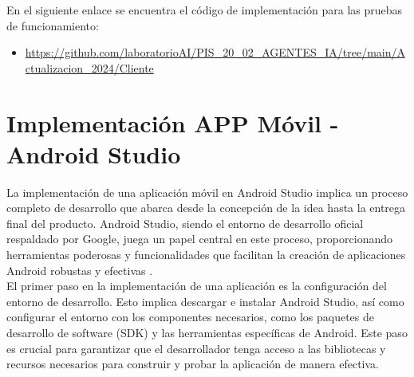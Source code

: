 \documentclass[a4paper,10pt, oneside, titlepage]{article}
\begin{document}
	\indent En el siguiente enlace se encuentra el código de implementación para las pruebas de funcionamiento:
	\begin{itemize}
		\item \textcolor{blue}{\url{https://github.com/laboratorioAI/PIS_20_02_AGENTES_IA/tree/main/Actualizacion_2024/Cliente}}
	\end{itemize}
	
	\section{Implementación APP Móvil - Android Studio}
	La implementación de una aplicación móvil en Android Studio implica un proceso completo de desarrollo que abarca desde la concepción de la idea hasta la entrega final del producto. Android Studio, siendo el entorno de desarrollo oficial respaldado por Google, juega un papel central en este proceso, proporcionando herramientas poderosas y funcionalidades que facilitan la creación de aplicaciones Android robustas y efectivas \cite{Android}. \\\newline
	\indent El primer paso en la implementación de una aplicación es la configuración del entorno de desarrollo. Esto implica descargar e instalar Android Studio, así como configurar el entorno con los componentes necesarios, como los paquetes de desarrollo de software (SDK) y las herramientas específicas de Android. Este paso es crucial para garantizar que el desarrollador tenga acceso a las bibliotecas y recursos necesarios para construir y probar la aplicación de manera efectiva.
\end{document}
